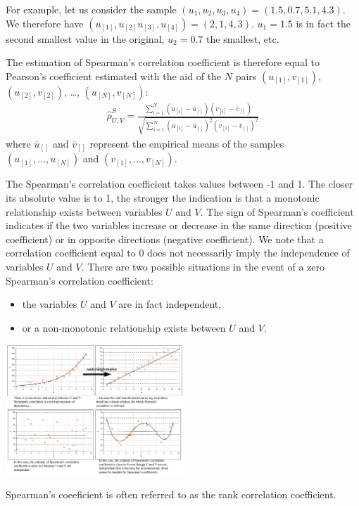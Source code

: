 {  For example, let us consider the sample $(u_1,u_2,u_3,u_4) = (1.5,0.7,5.1,4.3)$. We therefore have $(u_{[1]},u_{[2]}u_{[3]},u_{[4]}) = (2,1,4,3)$. $u_1 = 1.5$ is in fact the second smallest value in the original, $u_2 = 0.7$ the smallest, etc.

  The estimation of Spearman's correlation coefficient is therefore equal to Pearson's coefficient estimated with the aid of the $N$ pairs $(u_{[1]},v_{[1]})$, $(u_{[2]},v_{[2]})$, \ldots, $(u_{[N]},v_{[N]})$:
  \begin{align*}
    \widehat{\rho}^S_{U,V} = \frac{ \displaystyle \sum_{i=1}^N \left( u_{[i]} - \overline{u}_{[]} \right) \left( v_{[i]} - \overline{v}_{[]} \right) }{ \sqrt{\displaystyle \sum_{i=1}^N \left( u_{[i]} - \overline{u}_{[]} \right)^2 \left( v_{[i]} - \overline{v}_{[]} \right)^2} }
  \end{align*}
  where $\overline{u}_{[]}$ and  $\overline{v}_{[]}$ represent the empirical means of the samples $(u_{[1]},\ldots,u_{[N]})$ and $(v_{[1]},\ldots,v_{[N]})$.

  The Spearman's correlation coefficient takes values between -1 and 1. The closer its absolute value is to 1, the stronger the indication is that a monotonic relationship exists between variables $U$ and $V$. The sign of Spearman's coefficient indicates if the two variables increase or decrease in the same direction (positive coefficient) or in opposite directions (negative coefficient). We note that a correlation coefficient equal to 0 does not necessarily imply the independence of variables $U$ and $V$. There are two possible situations in the event of a zero Spearman's correlation coefficient:
  \begin{itemize}
  \item the variables $U$ and $V$ are in fact independent,
  \item or a non-monotonic relationship exists between $U$ and $V$.
  \end{itemize}

  \begin{center}
    \includegraphics[width=0.5\textwidth]{Figures/spearman.pdf}
  \end{center}
}
{
  Spearman's coeeficient is often referred to as the rank correlation coefficient.
}



